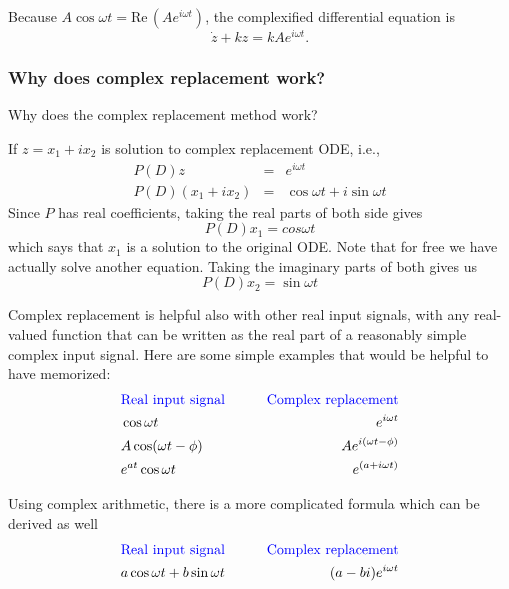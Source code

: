 Because $A \cos \omega t = \mathrm{Re\, }\left(Ae^{i\omega t}\right)$,
the complexified differential equation is
\begin{equation*}
  \dot z + kz = kAe^{i\omega t}.
\end{equation*}
\clearpage
\subsubsection{Why does complex replacement work?}

\begin{question}
  Why does the complex replacement method work?
\end{question}

If $z = x _1 + ix _2$ is solution to complex replacement ODE, i.e.,
\begin{eqnarray*}
  P(D)z &=& e^{i \omega t} \\
  P(D)(x _1 + i x _2) &=& \cos \omega t + i \sin \omega t  
\end{eqnarray*}
Since $P$ has real coefficients, taking the real parts of both side gives
\begin{equation*}
  P(D)x _1 = cos \omega t
\end{equation*}
which says that $x_ 1$ is a solution to the original ODE.
Note that for free we have actually solve another equation.
Taking the imaginary parts of both gives us
\begin{equation*}
  P(D)x _2 = \sin \omega t
\end{equation*}

Complex replacement is helpful also with other real input signals,
with any real-valued function that can be written
as the real part of a reasonably simple complex input signal.
Here are some simple examples that would be helpful to have memorized:
\begin{align*}
  &\text{\color{blue} Real input signal}  \qquad  &\text{\color{blue}Complex replacement} \\
  &\cos \omega t \qquad &e^{i \omega t} \\
  &A \cos(\omega t - \phi) \qquad &A e^{i(\omega t - \phi)} \\
  &e^{at} \cos \omega t \qquad &e^{(a + i \omega t)}
\end{align*}

Using complex arithmetic, there is a more complicated formula which can be derived as well 
\begin{align*}
  &\text{\color{blue} Real input signal}  \qquad  &\text{\color{blue}Complex replacement} \\
  &a \cos \omega t + b \sin \omega t \qquad &(a -bi)e^{i \omega t}
\end{align*}

